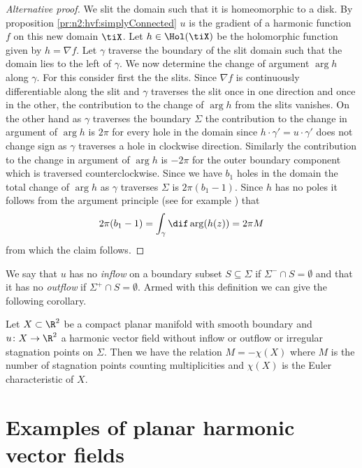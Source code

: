 \begin{proof}[Alternative proof]
  We slit the domain such that it is homeomorphic to a disk. By proposition \ref{pr:n2:hvf:simplyConnected} $u$ is the gradient of a
  harmonic function $f$ on this new domain $\tiX$. Let $h\in\Hol(\tiX)$ be the holomorphic function given by $h=\nabla f$.
  Let $\gamma$ traverse the boundary of the slit domain such that the domain lies to the left of $\gamma$.
  We now determine the change of argument $\arg h$ along $\gamma$. For this
  consider first the the slits. Since $\nabla f$ is continuously differentiable
  along the slit and $\gamma$ traverses the slit once in one direction and once in the other,
  the contribution to the change of $\arg h$ from the slits vanishes.
  On the other hand as $\gamma$ traverses the boundary $\Sigma$ the contribution to the change in
  argument of $\arg h$ is $2\pi$ for every hole in the domain 
  since $h\cdot\gamma'=u\cdot\gamma'$ does not change sign as $\gamma$ traverses a hole in clockwise direction.
  Similarly the contribution to the change in argument of $\arg h$ is $-2\pi$ for the outer boundary component
  which is traversed counterclockwise.
  Since we have $b_1$ holes in the domain the total change of $\arg h$ as $\gamma$ traverses $\Sigma$ is
  $2\pi(b_1-1)$.
  Since $h$ has no poles it follows from the argument principle (see for example \cite[Chapter VIII]{Gamelin2001}) that
  \begin{align*}
    2\pi(b_1-1)=\int_\gamma\dif\arg (h(z)) =  2\pi M
  \end{align*}
  from which the claim follows.
\end{proof}

We say that $u$ has no \emph{inflow} on a boundary subset $S\subseteq\Sigma$ if $\Sigma^-\cap S=\emptyset$ and
that it has no \emph{outflow} if $\Sigma^+\cap S=\emptyset$.
Armed with this definition we can give the following corollary.
\begin{corollary}[No in- or outflow]\label{co:n2_noInflowNoOutflow}
  Let $X\subset\R^2$ be a compact planar manifold with smooth boundary and $u\colon X\to\R^2$ a
  harmonic vector field without inflow or outflow 
  or irregular stagnation points on $\Sigma$. Then we have the relation $M=-\chi(X)$ where $M$ is the number of stagnation points counting multiplicities
  and $\chi(X)$ is the Euler characteristic of $X$.
\end{corollary}

\section{Examples of planar harmonic vector fields}

